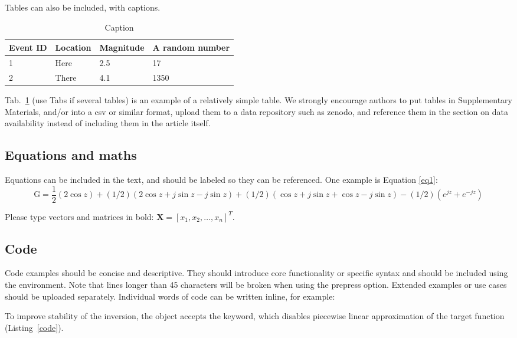 \documentclass[]{seismica}
\begin{document}
	
	Tables can also be included, with captions.
		\begin{table}[ht!]
			\begin{tabular}{llll}
				Event ID    & Location & Magnitude & A random number \\
				\hline
				1 & Here & 2.5 & 17 \\
				2 & There & 4.1 & 1350 \\
			\end{tabular}
			\caption{Caption}
			\label{tab:1}
		\end{table}
		
		Tab.~\ref{tab:1} (use Tabs if several tables) is an example of a relatively simple table. We strongly encourage authors to put tables in Supplementary Materials, and/or into a csv or similar format, upload them to a data repository such as zenodo, and reference them in the section on data availability instead of including them in the article itself. 
		
		\subsection{Equations and maths}
		Equations can be included in the text, and should be labeled so they can be referenced. One example is Equation \ref{eq1}:
		\begin{equation} \label{eq1}
			\mathrm{G} = \frac{1}{2}(2\cos z) + (1/2)(2\cos z+j\sin z-j\sin z) + (1/2)(\cos z+j\sin z+\cos z-j\sin z) -  (1/2)(e^{jz}+e^{-jz})  
		\end{equation}
		
		Please type vectors and matrices in bold: $\mathbf{X} = \left[x_1,x_2,\ldots,x_n \right]^T$.
		
		\subsection{Code}
		
		Code examples should be concise and descriptive. They should introduce core functionality or specific syntax and should be included using the  environment. Note that lines longer than 45 characters will be broken when using the prepress option. Extended examples or use cases should be uploaded separately. Individual words of code can be written inline, for example:
		
		To improve stability of the inversion, the  object accepts the  keyword, which disables piecewise linear approximation of the target function (Listing~\ref{code}).
		
\end{document}
